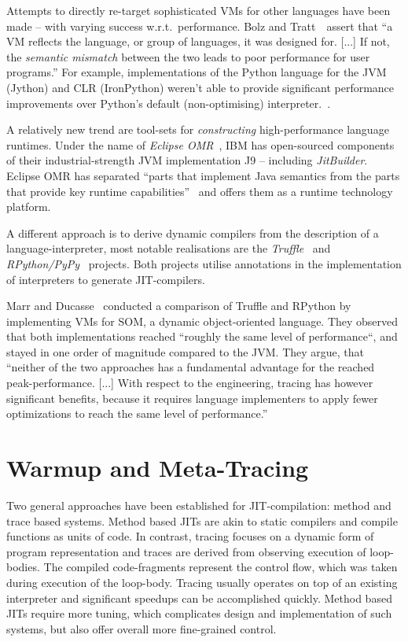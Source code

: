 Attempts to directly re-target sophisticated VMs for other languages have been
made -- with varying success w.r.t.~performance. Bolz and
Tratt~\cite{bolz14impact}~assert that ``a VM reflects the language, or group of
languages, it was designed for. [...] If not, the \emph{semantic mismatch}
between the two leads to poor performance for user programs.'' For example,
implementations of the Python language for the JVM (Jython) and CLR (IronPython)
weren't able to provide significant performance improvements over Python's
default (non-optimising) interpreter.~\cite{bolz14impact}.

A relatively new trend are tool-sets for \emph{constructing} high-performance
language runtimes. Under the name of \emph{Eclipse
OMR}~\cite{gaudet2016rebuilding}, IBM has open-sourced components of their
industrial-strength JVM implementation J9 -- including \emph{JitBuilder}.
Eclipse OMR has separated ``parts that implement Java semantics from the parts
that provide key runtime capabilities''~\cite{eclipseOMR} and offers them as a
runtime technology platform.

A different approach is to derive dynamic compilers from the description of a
language-interpreter, most notable realisations are the
\emph{Truffle}~\cite{wurthinger2013one} and
\emph{RPython/PyPy}~\cite{bolz2009tracing} projects. Both projects utilise
annotations in the implementation of interpreters to generate JIT-compilers.

Marr and Ducasse~\cite{marr2015tracing} conducted a  comparison of Truffle and
RPython by implementing VMs for SOM, a dynamic object-oriented language. They
observed that both implementations reached ``roughly the same level of
performance``, and stayed in one order of magnitude compared to the JVM. They
argue, that ``neither of the two approaches has a fundamental advantage for the
reached peak-performance. [...] With respect to the engineering, tracing has
however significant benefits, because it requires language implementers to apply
fewer optimizations to reach the same level of performance.''



\section{Warmup and Meta-Tracing}

Two general approaches have been established for JIT-compilation: method and
trace based systems. Method based JITs are akin to static compilers and compile
functions as units of code. In contrast, tracing focuses on a dynamic form of
program representation and traces are derived from observing execution of
loop-bodies. The compiled code-fragments represent the control flow, which was
taken during execution of the loop-body. Tracing usually operates on top of an
existing interpreter and significant speedups can be accomplished quickly.
Method based JITs require more tuning, which complicates design and
implementation of such systems, but also offer overall more fine-grained
control.

